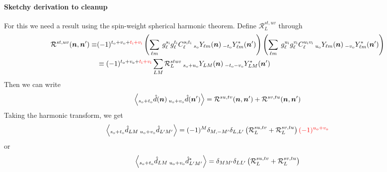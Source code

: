 \documentclass[reprint,prd, superscriptaddress, tightenlines, longbibliography, nofootinbib, eqsecnum, amsfonts, amsmath, floatfix, notitlepage, onecolumn]{revtex4-1}
\newcommand{\si}[0]{{s_{\rm i}}}
\newcommand{\ti}[0]{{t_{\rm i}}}
\newcommand{\ui}[0]{{u_{\rm i}}}
\newcommand{\vi}[0]{{v_{\rm i}}}
\newcommand{\so}[0]{{s_{\rm o}}}
\renewcommand{\to}[0]{{t_{\rm o}}}
\newcommand{\uo}[0]{{u_{\rm o}}}
\newcommand{\vo}[0]{{v_{\rm o}}}
\newcommand{\Ylm}[1]{\:_{#1}Y_{\ell m}}
\newcommand{\Ylms}[1]{\:_{#1}Y^*_{\ell m}}
\newcommand{\YLM}[1]{\:_{#1}Y_{L M}}
\newcommand{\YLMs}[1]{\:_{#1}Y^*_{L M}}
\newcommand{\av}[1]{\left\langle #1 \right\rangle}
\newcommand{\red}[1]{\color{red}#1 \color{black} }
\newcommand{\hn}[0]{\boldsymbol{n}}
\begin{document}
\paragraph{Sketchy derivation to cleanup}
For this we need a result using the spin-weight spherical harmonic theorem.
Define $\mathcal R^{st,uv}_L $ through
\begin{equation}
\begin{split}
\mathcal R^{st,uv}(\hn, \hn') \equiv	& (-1)^{\to + \vo + \red{\ti + \vi} }\left(\sum_{\ell m}\: g^{\si}_\ell g^{\ti}_\ell C_\ell^{\si \ti} \Ylm \so(\hn)   \Ylms {-\to}  (\hn')\right) \left(\sum_{\ell m}\: g^{\ui}_\ell g^{\vi}_\ell C_\ell^{\ui \vi} \Ylm \uo(\hn)   \Ylms {-\vo} (\hn')\right) \\ &\equiv (-1)^{\to + \vo + \red{\ti + \vi}} \sum_{LM} \mathcal R^{stuv}_L  \YLM{\so + \uo}(\hn)   \YLMs {-\to - \vo} (\hn')
\end{split}
\end{equation}
Then we can write
\begin{equation}
\begin{split}
	\av{ _{\so + \to}\hat d(\hn)\: _{\uo + \vo}\hat d(\hn')} =\mathcal R^{su,tv}(\hn, \hn') + \mathcal R^{sv,tu}(\hn, \hn')
\end{split}
\end{equation}
Taking the harmonic transform, we get
\begin{equation}
	\av{ _{\so + \to}\hat d_{LM} \:_{\uo + \vo}\hat d_{L'M'}} = (-1)^M\delta_{M, -M'}\delta_{L,L'}\left(\mathcal R^{su, tv}_L + \mathcal R^{sv, tu}_L\right)\red{(-1)^{\uo + \vo}}
\end{equation}
\red{or
\begin{equation}
	\av{ _{\so + \to}\hat d_{LM} \:_{\uo + \vo}\hat d^*_{L'M'}} = \delta_{MM'}\delta_{LL'}\left(\mathcal R^{su, tv}_L + \mathcal R^{sv, tu}_L\right)
\end{equation}}
\end{document}
